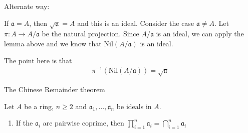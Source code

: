 \documentclass{book}
\theoremstyle{custom_definition}
\begin{document}
    Alternate way:

    If \(\mathfrak{a} = A\), then \(\sqrt{\mathfrak{a}} = A\) and this is an ideal. Consider the case \(\mathfrak{a} \neq A\). Let \(\pi: A \longrightarrow A / \mathfrak{a}\) be the natural projection. Since \(A / \mathfrak{a}\) is an ideal, we can apply the lemma above and we know that \(\text{Nil}(A / \mathfrak{a})\) is an ideal.

    The point here is that
    \begin{align}
        \pi^{-1} (\text{Nil}(A / \mathfrak{a})) = \sqrt{\mathfrak{a}}
    \end{align}


    The Chinese Remainder theorem

    Let \(A\) be a ring, \(n \geq 2\) and \(\mathfrak{a}_1, \ldots, \mathfrak{a}_n\) be ideals in \(A\).
    \begin{enumerate}
        \item If the \(\mathfrak{a}_i\) are pairwise coprime, then \(\prod_{i=1}^n \mathfrak{a}_i = \bigcap_{i=1}^n \mathfrak{a}_i\)
    \end{enumerate}
\end{document}
